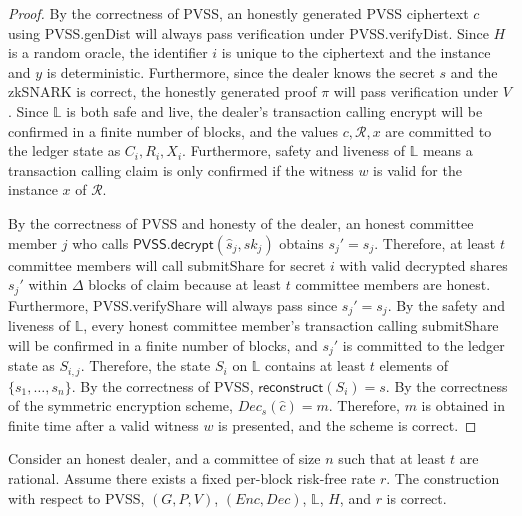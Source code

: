 \begin{proof}
    By the correctness of PVSS, an honestly generated PVSS ciphertext $c$ using \textsf{PVSS.genDist} will always pass verification under \textsf{PVSS.verifyDist}.
    Since $H$ is a random oracle, the identifier $i$ is unique to the ciphertext and the instance and $y$ is deterministic.
    Furthermore, since the dealer knows the secret $s$ and the zkSNARK is correct, the honestly generated proof $\pi$ will pass verification under $V$. 
    Since $\mathbb{L}$ is both safe and live, the dealer's transaction calling \textsf{encrypt} will be confirmed in a finite number of blocks, and the values $c, \mathcal{R}, x$ are committed to the ledger state as $C_i, R_i, X_i$.
    Furthermore, safety and liveness of $\mathbb{L}$ means a transaction calling \textsf{claim} is only confirmed if the witness $w$ is valid for the instance $x$ of $\mathcal{R}$.

    By the correctness of PVSS and honesty of the dealer, an honest committee member $j$ who calls $\textsf{PVSS.decrypt}(\hat{s}_j, sk_j)$ obtains $s_j' = s_j$.
    Therefore, at least $t$ committee members will call \textsf{submitShare} for secret $i$ with valid decrypted shares $s_j'$ within $\Delta$ blocks of \textsf{claim} because at least $t$ committee members are honest.
    Furthermore, \textsf{PVSS.verifyShare} will always pass since $s_j' = s_j$.
    By the safety and liveness of $\mathbb{L}$, every honest committee member's transaction calling \textsf{submitShare} will be confirmed in a finite number of blocks, and $s_j'$ is committed to the ledger state as $S_{i,j}$.
    Therefore, the state $S_i$ on $\mathbb{L}$ contains at least $t$ elements of $\{s_1, \dots, s_n\}$.
    By the correctness of PVSS, $\textsf{reconstruct}(S_i) = s$.
    By the correctness of the symmetric encryption scheme, $Dec_s(\hat{c}) = m$.
    Therefore, $m$ is obtained in finite time after a valid witness $w$ is presented, and the scheme is correct.
\end{proof}
\begin{theorem}
    Consider an honest dealer, and a committee of size $n$ such that at least $t$ are rational.
    Assume there exists a fixed per-block risk-free rate $r$.
    The construction with respect to \textsf{PVSS}, $(G, P, V)$, $(Enc, Dec)$, $\mathbb{L}$, $H$, and $r$ is correct.
\end{theorem}